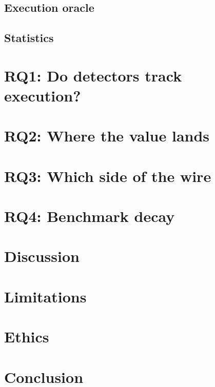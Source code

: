 \documentclass[sigconf,anonymous,review]{acmart}
\begin{document}
\subsection{Execution oracle}\label{sec:oracle}
\subsection{Statistics}         %

\section{RQ1: Do detectors track execution?}\label{sec:rq1}

\section{RQ2: Where the value lands}\label{sec:rq2}

\section{RQ3: Which side of the wire}\label{sec:rq3}

\section{RQ4: Benchmark decay}\label{sec:rq4}

\section{Discussion}

\section{Limitations}
\section{Ethics}

\section{Conclusion}



\end{document}
